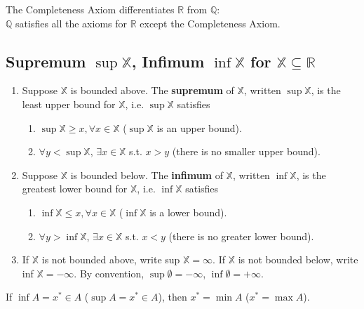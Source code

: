 \documentclass[11pt]{elegantbook}
\begin{document}
\begin{claim}
    \normalfont
    The Completeness Axiom differentiates $\mathbb{R}$ from $\mathbb{Q}$:\\
    $\mathbb{Q}$ satisfies all the axioms for $\mathbb{R}$ except the Completeness Axiom.
\end{claim}

\subsection{Supremum $\sup\mathbb{X}$, Infimum $\inf\mathbb{X}$ for $\mathbb{X}\subseteq \mathbb{R}$}
\begin{definition}
    \normalfont
    \begin{enumerate}[(1).]
        \item Suppose $\mathbb{X}$ is bounded above. The \textbf{supremum} of $\mathbb{X}$, written $\sup\mathbb{X}$, is the least upper bound for $\mathbb{X}$, i.e. $\sup\mathbb{X}$ satisfies
        \begin{enumerate}
            \item $\sup\mathbb{X} \geq x,\forall x\in \mathbb{X}$ ($\sup\mathbb{X}$ is an upper bound).
            \item $\forall y<\sup\mathbb{X}$, $\exists x\in\mathbb{X}$ s.t. $x>y$ (there is no smaller upper bound).
        \end{enumerate}
        \item Suppose $\mathbb{X}$ is bounded below. The \textbf{infimum} of $\mathbb{X}$, written $\inf\mathbb{X}$, is the greatest lower bound for $\mathbb{X}$, i.e. $\inf\mathbb{X}$ satisfies
        \begin{enumerate}
            \item $\inf\mathbb{X} \leq x,\forall x\in \mathbb{X}$ ($\inf\mathbb{X}$ is a lower bound).
            \item $\forall y>\inf\mathbb{X}$, $\exists x\in\mathbb{X}$ s.t. $x<y$ (there is no greater lower bound).
        \end{enumerate}
        \item If $\mathbb{X}$ is not bounded above, write sup $\mathbb{X} = \infty$. If $\mathbb{X}$ is not bounded below, write inf $\mathbb{X} = -\infty$. By convention, $\sup \emptyset = -\infty$, $\inf \emptyset = +\infty$.
    \end{enumerate}
\end{definition}
\begin{proposition}
    If $\inf A=x^*\in A$ ($\sup A=x^*\in A$), then $x^*=\min A$ ($x^*=\max A$).
\end{proposition}
\end{document}
